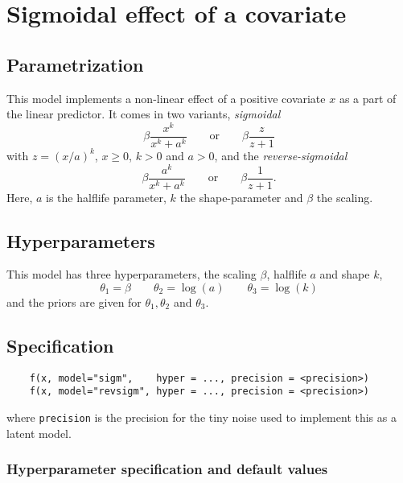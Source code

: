 \documentclass[a4paper,11pt]{article}
\begin{document}
\section*{Sigmoidal effect of a covariate}

\subsection*{Parametrization}

This model implements a non-linear effect of a positive covariate $x$
as a part of the linear predictor. It comes in two variants,
\emph{sigmoidal}
\begin{displaymath}
    \beta \frac{x^{k}}{x^{k} + a^{k}}\qquad\text{or}\qquad \beta \frac{z}{z+1}
\end{displaymath}
with $z    = (x/a)^{k}$, 
 $x\ge 0$, $k>0$ and $a>0$, and the \emph{reverse-sigmoidal}
\begin{displaymath}
    \beta \frac{a^{k}}{x^{k} + a^{k}} \qquad\text{or}\qquad \beta \frac{1}{z+1}.
\end{displaymath}
Here, $a$ is the halflife parameter, $k$ the shape-parameter and
$\beta$ the scaling.

\subsection*{Hyperparameters}

This model has three hyperparameters, the scaling $\beta$, halflife
$a$ and shape $k$,
\begin{displaymath}
    \theta_1 = \beta \qquad \theta_2 = \log(a) \qquad  \theta_3 = \log(k)
\end{displaymath}
and the priors are given for $\theta_1, \theta_2$ and $\theta_3$.


\subsection*{Specification}

\begin{verbatim}
    f(x, model="sigm",    hyper = ..., precision = <precision>)
    f(x, model="revsigm", hyper = ..., precision = <precision>)
\end{verbatim}
where \texttt{precision} is the precision for the tiny noise used to
implement this as a latent model. 

\subsubsection*{Hyperparameter specification and default values}

\end{document}
